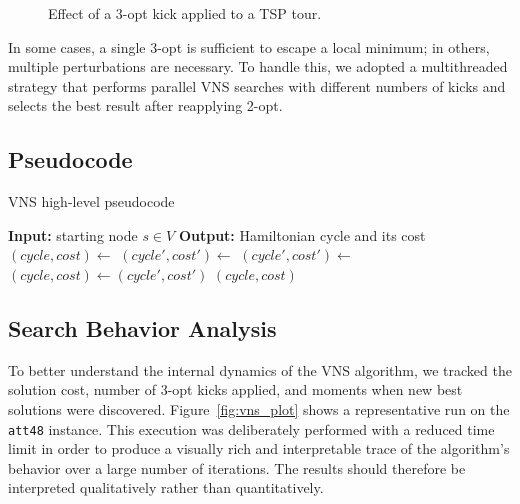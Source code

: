 \begin{figure}[h]
\begin{subfigure}[c]{.4\textwidth}
{
        }
    \end{subfigure}
    \caption{Effect of a 3-opt kick applied to a TSP tour.}
    \label{fig:3optkick}
\end{figure}

In some cases, a single 3-opt is sufficient to escape a local minimum; in others, multiple perturbations are necessary. 
To handle this, we adopted a multithreaded strategy that performs parallel VNS searches with different numbers of kicks and selects 
the best result after reapplying 2-opt.

\subsection{Pseudocode}

\begin{algorithm}
\caption{VNS high-level pseudocode}
\label{alg:vns_highlevel}
\begin{algorithmic}
\State \textbf{Input:} starting node $s \in V$
\State \textbf{Output:} Hamiltonian cycle and its cost
\State
\State $(cycle, cost) \gets$ 
    \State $(cycle', cost') \gets$ 
    \State $(cycle', cost') \gets$ 
        \State $(cycle, cost) \gets (cycle', cost')$
    \EndIf
\EndWhile
\State \Return $(cycle, cost)$
\end{algorithmic}
\end{algorithm}

\subsection{Search Behavior Analysis}

To better understand the internal dynamics of the VNS algorithm, we tracked the solution cost, number of 3-opt kicks applied, and moments when new best solutions were discovered. Figure~\ref{fig:vns_plot} shows a representative run on the \texttt{att48} instance. This execution was deliberately performed with a reduced time limit in order to produce a visually rich and interpretable trace of the algorithm's behavior over a large number of iterations. The results should therefore be interpreted qualitatively rather than quantitatively.


